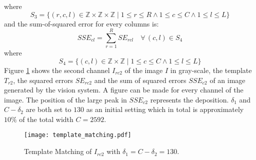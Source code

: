 where 
\begin{equation}
S_3 = \{(r,c,l)\in \mathbb {Z} \times \mathbb {Z} \times \mathbb {Z}  \mid 1 \leq r \leq R \land 1 \leq c \leq C \land 1 \leq l \leq L \} 
\end{equation}
and the sum-of-squared error for every columns is:
\begin{equation}
SSE_{cl} = \sum^{R}_{r=1} SE_{rcl} \quad \forall \, (c,l) \in S_4
\end{equation}
where
\begin{equation}
S_4 = \{(c,l)\in \mathbb {Z} \times \mathbb {Z} \mid 1 \leq c \leq C \land 1 \leq l \leq L \}  
\end{equation}
Figure \ref{fig: template_matching} shows the second channel $I_{rc2}$ of the image $I$ in gray-scale, the template $T_{r2}$, the squared errors $SE_{rc2}$ and the sum of squared errors $SSE_{c2}$ of an image generated by the vision system. A figure can be made for every channel of the image. The position of the large peak in $SSE_{c2}$ represents the deposition. $\delta_1$ and $C-\delta_2$ are both set to $130$ as an initial setting which in total is approximately $10\%$ of the total width $C=2592$.

\begin{figure}[!ht]
\centering
\texttt{[image: template\_matching.pdf]} 
\caption{Template Matching of $I_{rc2}$ with $\delta_1=C-\delta_2=130$.}
\label{fig: template_matching}
\end{figure}

